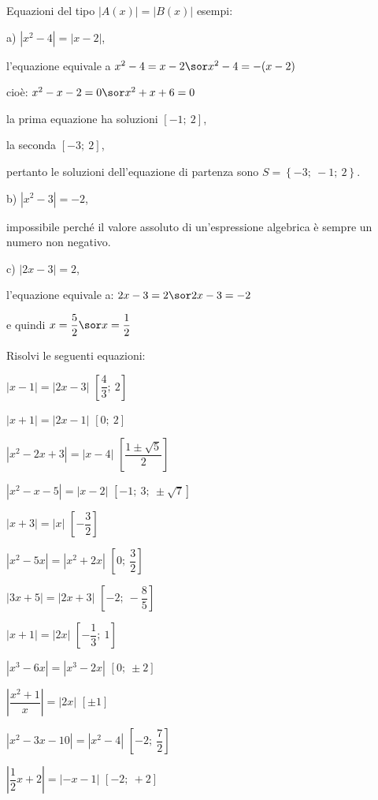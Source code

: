 \begin{esercizio}\label{ese:03.1}
Equazioni del tipo \(|A(x)|=|B(x)|\) esempi:
\begin{enumeratea}
\item[a)] \(|x^2-4|=|x-2|\), 

l'equazione equivale a \quad \(x^2-4=x-2 \sor x^2-4=-(x-2)\)

cioè: \quad \(x^2-x-2=0 \sor x^2+x+6=0\)

la prima equazione ha soluzioni \([-1;~2]\), 

la seconda \([-3;~2]\), 

pertanto le soluzioni dell'equazione di partenza sono 
\(S=\left\lbrace -3;~-1;~2\right\rbrace \).

\item[b)] \(|x^2-3|=-2\), 

impossibile perché il valore assoluto di 
un'espressione algebrica è sempre un numero non negativo.
\item[c)] \(|2x-3|=2\), 

l'equazione equivale a: \quad \(2x-3=2 \sor 2x-3=-2\)

e quindi \quad \(x=\dfrac{5}{2} \sor x=\dfrac{1}{2}\)
\end{enumeratea}

\noindent Risolvi le seguenti equazioni:

\begin{multicols}{2}
\begin{enumeratea}
\item \(\left| x-1\right| =\left| 2x-3\right| \) 
\hfill \(\left[\dfrac{4}{3};~2\right] \)
\item \(\left| x+1\right| =\left| 2x-1\right| \) 
\hfill \(\left[ 0;~2\right]\)
\item \(\left| x^2-2x+3 \right| =\left| x-4 \right| \) 
\hfill \(\left[\dfrac{1\pm\sqrt{5}}{2}\right] \)
\item \(\left| x^2-x-5\right| =\left| x-2\right| \) 
\hfill \(\left[-1;~3;~\pm \sqrt{7}\right] \)
\item \(\left| x+3\right| =\left| x\right| \) 
\hfill \(\left[ -\dfrac{3}{2} \right] \)
\item \(\left| x^2-5x \right| =\left| x^2+2x \right| \) 
\hfill \(\left[ 0;~\dfrac{3}{2} \right] \)
\item \(\left| 3x+5\right| =\left| 2x+3\right| \) 
\hfill \(\left[-2;~-\dfrac{8}{5} \right] \)
\item \(\left| x+1\right| =\left| 2x\right| \) 
\hfill \(\left[-\dfrac{1}{3};~1 \right] \)
\item \(\left| x^3-6x\right| =\left| x^3-2x\right| \) 
\hfill \(\left[ 0;~\pm 2 \right] \)
\item \(\left|\dfrac{x^2+1}{x}\right| =\left| 2x\right| \) 
\hfill \(\left[\pm 1 \right] \)
\item \(\left| x^2-3x-10\right| =\left| x^2-4\right| \) 
\hfill \(\left[-2;~\dfrac{7}{2} \right] \)
\item \(\left| \dfrac{1}{2}x+2\right| =\left|-x-1\right| \) 
\hfill \(\left[-2;~+2 \right] \)
\end{enumeratea}
\end{multicols}
\end{esercizio}

